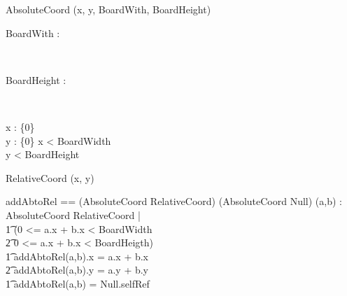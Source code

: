\documentclass[12pt]{article}
\begin{document}
\begin{class}{AbsoluteCoord}
\upharpoonright (x, y, BoardWith, BoardHeight) \\
\begin{axdef}
BoardWith : \nat
\end{axdef} \\
\begin{axdef}
BoardHeight : \nat
\end{axdef} \\
\begin{state}
x : \nat \cup \{0\} \\
y : \nat \cup \{0\}
\where
x < BoardWidth \\
y < BoardHeight
\end{state}
\end{class}

\begin{class}{RelativeCoord}
\upharpoonright (x, y) \\
\end{class}

\begin{axdef}
addAbtoRel == (AbsoluteCoord \cross RelativeCoord) \rightarrow (AbsoluteCoord \union Null)
\where
\forall (a,b) : AbsoluteCoord \cross RelativeCoord | \\ \t1
\IF (0 <= a.x + b.x < BoardWidth \\ \t2
0 <= a.x + b.x < BoardHeigth) \\ \t1
\THEN
addAbtoRel(a,b).x = a.x + b.x \\ \t2
addAbtoRel(a,b).y = a.y + b.y \\ \t1
\ELSE addAbtoRel(a,b) = Null.selfRef
\end{axdef}
\end{document}
